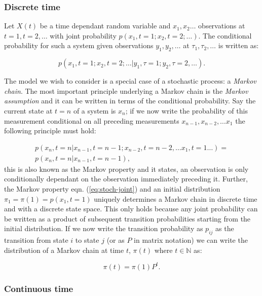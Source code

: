\subsubsection{Discrete time}

Let $X(t)$ be a time dependant random variable and $x_1, x_2 \ldots $ observations at $t=1, t =2, \ldots$ with joint probability $p(x_1, t=1; x_2, t=2; \ldots)$. The conditional probability for such a system given observations $y_1, y_2, \ldots$ at $\tau_1, \tau_2, \ldots $ is written as:

\begin{equation}
  \label{eq:stoch-joint-init}
  p(x_1, t=1; x_2, t=2; \ldots | y_1, \tau=1; y_2,\tau=2, \ldots).
\end{equation}

The model we wish to consider is a special case of a stochastic process: a \emph{Markov chain}. The most important principle underlying a Markov chain is the \emph{Markov assumption} and it can be written in terms of the conditional probability. Say the current state at $t=n$ of a system is $x_n$; if we now write the probability of this measurement conditional on all preceding measurements $x_{n-1}, x_{n-2}, \ldots x_1$ the following principle must hold:

\begin{multline}
  \label{eq:stoch-joint}
  p(x_n, t=n | x_{n-1}, t={n-1}; x_{n-2}, t={n-2}, \ldots x_1, t=1 \ldots) = \\ p(x_{n},t={n}| x_{n-1},t={n-1}),
\end{multline}
this is also known as the Markov property and it states, an observation is only conditionally dependant on the observation immediately preceding it. Further, the Markov property eqn. (\ref{eq:stoch-joint}) and an initial distribution $\pi_1 = \pi(1) = p(x_1,t=1)$ uniquely determines a Markov chain in discrete time and with a discrete state space. This only holds because any joint probability can be written as a product of subsequent transition probabilities starting from the initial distribution. If we now write the transition probability as $p_{ij}$ as the transition from state $i$ to state $j$ (or as $P$ in matrix notation) we can write the distribution of a Markov chain at time $t$, $\pi(t)$ where $t \in \mathbb{N}$ as:

\begin{equation}
  \label{eq:markov-chain}
  \pi(t) = \pi(1)P^t.
\end{equation}

\subsubsection{Continuous time}
\label{sec:continous-time}

